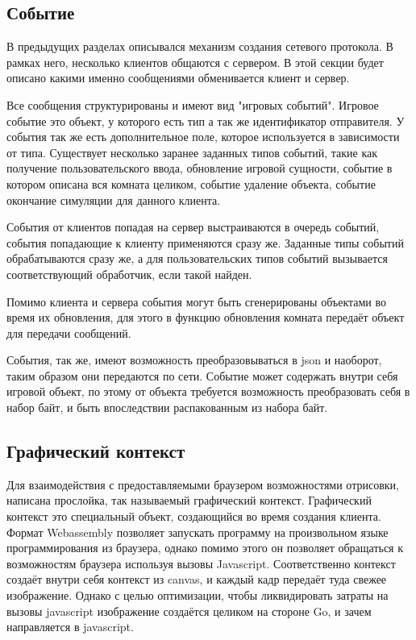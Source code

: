 \documentclass[a4paper,14pt, openany]{book}
\begin{document}
\subsection{Событие}

В предыдущих разделах описывался механизм создания сетевого протокола. В рамках него, несколько клиентов общаются с сервером. В этой секции будет описано какими именно сообщениями обменивается клиент и сервер.

Все сообщения структурированы и имеют вид "игровых событий". Игровое событие это объект, у которого есть тип а так же идентификатор отправителя. У события так же есть дополнительное поле, которое используется в зависимости от типа. Существует несколько заранее заданных типов событий, такие как получение пользовательского ввода, обновление игровой сущности, событие в котором описана вся комната целиком, событие удаление объекта, событие окончание симуляции для данного клиента.

События от клиентов попадая на сервер выстраиваются в очередь событий, события попадающие к клиенту применяются сразу же. Заданные типы событий обрабатываются сразу же, а для пользовательских типов событий вызывается соответствующий обработчик, если такой найден. 

Помимо клиента и сервера события могут быть сгенерированы объектами во время их обновления, для этого в функцию обновления комната передаёт объект для передачи сообщений.

События, так же, имеют возможность преобразовываться в json и наоборот, таким образом они передаются по сети. Событие может содержать внутри себя игровой объект, по этому от объекта требуется возможность преобразовать себя в набор байт, и быть впоследствии распакованным из набора байт.

\subsection{Графический контекст}

Для взаимодействия с предоставляемыми браузером возможностями отрисовки, написана прослойка, так называемый графический контекст. Графический контекст это специальный объект, создающийся во время создания клиента. Формат Webassembly позволяет запускать программу на произвольном языке программирования из браузера, однако помимо этого он позволяет обращаться к возможностям браузера используя вызовы Javascript. Соответственно контекст создаёт внутри себя контекст из canvas, и каждый кадр передаёт туда свежее изображение. Однако с целью оптимизации, чтобы ликвидировать затраты на вызовы javascript изображение создаётся целиком на стороне Go, и зачем направляется в javascript. 
\end{document}
